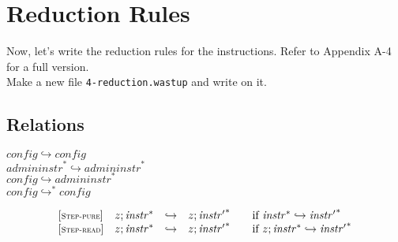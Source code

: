 \documentclass{article}
\newenvironment{lcverbatim}
 {\SaveVerbatim{cverb}}
 {\endSaveVerbatim
  \flushleft\fboxrule=0pt\fboxsep=.5em
  \colorbox{cverbbg}{%
    \makebox[\dimexpr\linewidth-2\fboxsep][l]{\BUseVerbatim{cverb}}%
  }
  \endflushleft
}
\newcommand\K[1]{\texttt{#1}}
\begin{document}
\section{Reduction Rules}
Now, let's write the reduction rules for the instructions. Refer to Appendix A-4 for a full version. \\
Make a new file \K{4-reduction.wastup} and write on it.

\subsection{Relations}

$\boxed{{\mathit{config}} \hookrightarrow {\mathit{config}}}$ \\
$\boxed{{{\mathit{admininstr}}^\ast} \hookrightarrow {{\mathit{admininstr}}^\ast}}$ \\
$\boxed{{\mathit{config}} \hookrightarrow {{\mathit{admininstr}}^\ast}}$ \\
$\boxed{{\mathit{config}} \hookrightarrow^\ast {\mathit{config}}}$

$$
\begin{array}{@{}l@{}rcl@{}l@{}}
	{[\textsc{\scriptsize Step{-}pure}]} \quad & z ; {{\mathit{instr}}^\ast} &\hookrightarrow& z ; {{\mathit{instr}'}^\ast}
	&\qquad \mbox{if}~{{\mathit{instr}}^\ast} \hookrightarrow {{\mathit{instr}'}^\ast} \\
	{[\textsc{\scriptsize Step{-}read}]} \quad & z ; {{\mathit{instr}}^\ast} &\hookrightarrow& z ; {{\mathit{instr}'}^\ast}
	&\qquad \mbox{if}~z ; {{\mathit{instr}}^\ast} \hookrightarrow {{\mathit{instr}'}^\ast} \\
\end{array}
$$
\end{document}
